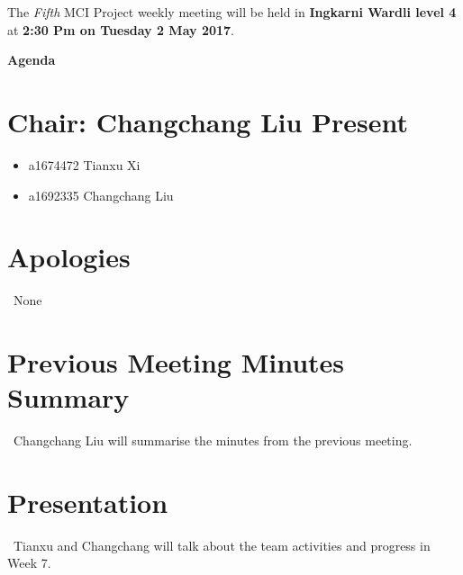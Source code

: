 \documentclass[11pt, a4paper]{article}
\begin{document}
\noindent The {\em Fifth} MCI Project weekly meeting will be held in {\bf Ingkarni Wardli level 4} at {\bf 2:30 Pm on Tuesday 2 May 2017}.


\vspace*{15pt}

\begin{center}
\huge \bf Agenda
\end{center}



\section*{Chair: Changchang Liu                    Present}
\begin{itemize}
	\item a1674472  Tianxu Xi
	\item a1692335 Changchang Liu
\end{itemize}

\section{Apologies}
\ None \\


\section{Previous Meeting Minutes Summary}
\ Changchang Liu will summarise the minutes from the previous meeting.


\section{Presentation}
\ Tianxu and Changchang will talk about the team activities and progress in Week 7. \\

\end{document}
